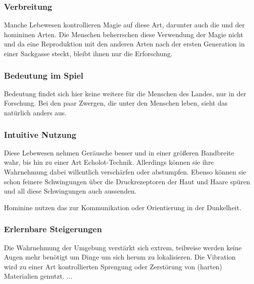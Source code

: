 \subsubsection{Verbreitung}
Manche Lebewesen kontrollieren Magie auf diese Art, darunter auch die  und  der homininen Arten. Die Menschen beherrschen diese Verwendung der Magie nicht und da eine Reproduktion mit den anderen Arten nach der ersten Generation in einer Sackgasse steckt, bleibt ihnen nur die Erforschung.

\subsubsection{Bedeutung im Spiel}
Bedeutung findet sich hier keine weitere für die Menschen des Landes, nur in der Forschung. 
Bei den paar Zwergen, die unter den Menschen leben, sieht das natürlich anders aus.

\subsubsection{Intuitive Nutzung}
Diese Lebewesen nehmen Geräusche besser und in einer größeren Bandbreite wahr, bis hin zu einer Art Echolot-Technik. 
Allerdings können sie ihre Wahrnehmung dabei willentlich verschärfen oder abstumpfen. 
Ebenso können sie schon feinere Schwingungen über die Druckrezeptoren der Haut und Haare spüren und all diese Schwingungen auch aussenden.

Hominine nutzen das zur Kommunikation oder Orientierung in der Dunkelheit. 

\subsubsection{Erlernbare Steigerungen}
\begin{outline}
	\1 Die Wahrnehmung der Umgebung verstärkt sich extrem, teilweise werden keine Augen mehr benötigt um Dinge um sich herum zu lokalisieren. 
	\1 Die Vibration wird zu einer Art kontrollierten Sprengung oder Zerstörung von (harten) Materialien genutzt.
	\1 ...
\end{outline}

